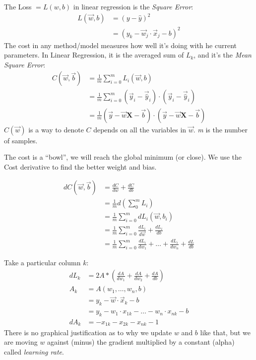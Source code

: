 \documentclass[14pt]{article}
\begin{document}
The Loss $= L(w,b)$ in linear regression is the \textit{Square Error}:
\begin{align*}
  L(\vec{w},b) &= (y - \hat{y})^2\\
  &= (y_k - \vec{w}_j\cdot \vec{x}_j - b)^2
\end{align*}
The cost in any method/model measures how well it's doing with he current parameters. In Linear Regression, it is the averaged sum of $L_k$, and it's the \textit{Mean Square Error}:
\begin{align}
  C(\vec{w}, \vec{b}) &= \frac{1}{m}\sum_{i=0}^m L_i(\vec{w}, b)\\
  &=\frac{1}{m}\sum_{i=0}^m (\vec{y}_i - \vec{\hat{y}}_i)\cdot{}(\vec{y}_i - \vec{\hat{y}}_i)\\
  &= \frac{1}{m} (\vec{y} - \vec{w}\mathbf{X} - \vec{b})\cdot{}(\vec{y} - \vec{w}\mathbf{X} - \vec{b})
\end{align}
$C(\vec{w})$ is a way to denote $C$ depends on all the variables in $\vec{w}$. \textit{m} is the number of samples.

The cost is a ``bowl'', we will reach the global minimum (or close).
We use the Cost derivative to find the better weight and bias. 

\begin{align*}
  dC(\vec{w}, \vec{b}) &= \frac{dC}{dw} + \frac{dC}{db}\\
  &= \frac{1}{m} d(\sum^m_0 L_i)\\
  &= \frac{1}{m} \sum^m_{i=0} dL_i(\vec{w}, b_i)\\
  &= \frac{1}{m} \sum^m_{i=0} \frac{dL_i}{d\vec{w}} + \frac{dL_i}{db}\\
  &= \frac{1}{m} \sum^m_{i=0} \frac{dL_i}{dw_1} +\ldots +\frac{dL_i}{dw_n} + \frac{dL}{db}
\end{align*}

Take a particular column $k$:
\begin{align*}
  dL_k &= 2A * (\frac{dA}{dw_1}+ \frac{dA}{dw_2}+ \frac{dA}{db})\\
  A_k &= A(w_1, \ldots, w_n, b)\\
      &= y_k - \vec{w}\cdot{}\vec{x}_k - b \\
      &= y_k - w_1\cdot{}x_{1k}-\ldots{}-w_n\cdot{}x_{nk} - b \\
  dA_k &=  -x_{1k} -x_{2k} - x_{nk} -1 
\end{align*}
There is no graphical justification as to why we update $w$ and $b$ like that, but we are moving $w$ against (minus) the gradient multiplied by a constant (alpha) called \textit{learning rate}.
\end{document}
